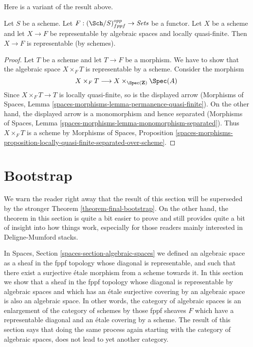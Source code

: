 \noindent
Here is a variant of the result above.

\begin{lemma}
\label{lemma-bootstrap-locally-quasi-finite}
Let $S$ be a scheme. Let $F : (\Sch/S)_{fppf}^{opp} \to \textit{Sets}$ be a
functor. Let $X$ be a scheme and let $X \to F$ be representable by algebraic
spaces and locally quasi-finite. Then $X \to F$ is representable
(by schemes).
\end{lemma}

\begin{proof}
Let $T$ be a scheme and let $T \to F$ be a morphism. We have to show that
the algebraic space $X \times_F T$ is representable by a scheme. Consider
the morphism
$$
X \times_F T  \longrightarrow X \times_{\Spec(\mathbf{Z})} \Spec(A)
$$
Since $X \times_F T \to T$ is locally quasi-finite, so is the displayed
arrow (Morphisms of Spaces, Lemma
\ref{spaces-morphisms-lemma-permanence-quasi-finite}).
On the other hand, the displayed arrow is a monomorphism
and hence separated (Morphisms of Spaces, Lemma
\ref{spaces-morphisms-lemma-monomorphism-separated}).
Thus $X \times_F T$ is a scheme by Morphisms of Spaces, Proposition
\ref{spaces-morphisms-proposition-locally-quasi-finite-separated-over-scheme}.
\end{proof}











\section{Bootstrap}
\label{section-bootstrap}

\noindent
We warn the reader right away that the result of this section will
be superseded by the stronger
Theorem \ref{theorem-final-bootstrap}.
On the other hand, the theorem in this section is quite a bit easier to
prove and still provides quite a bit of insight into how things work,
especially for those readers mainly interested in Deligne-Mumford
stacks.

\medskip\noindent
In
Spaces, Section \ref{spaces-section-algebraic-spaces}
we defined an algebraic space as a sheaf in the fppf topology whose
diagonal is representable, and such that there exist a surjective \'etale
morphism from a scheme towards it. In this section we show that
a sheaf in the fppf topology whose diagonal is representable by algebraic
spaces and which has an \'etale surjective covering by an algebraic space
is also an algebraic space.
In other words, the category of algebraic spaces is an enlargement of the
category of schemes by those fppf sheaves $F$ which have a representable
diagonal and an \'etale covering by a scheme. The
result of this section says that doing the same process again starting with
the category of algebraic spaces, does not lead to yet another category.


